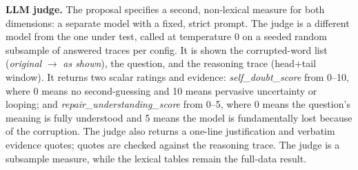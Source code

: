 \documentclass[11pt]{article}
\begin{document}
\noindent\textbf{LLM judge.} The proposal specifies a second,
non-lexical measure for both dimensions: a separate model with a fixed, strict prompt.
The judge is a different model from the one under test, called at temperature 0 on a
seeded random subsample of answered traces per config. It is shown the corrupted-word
list (\emph{original} $\to$ \emph{as shown}), the question, and the reasoning trace
(head+tail window). It returns two scalar ratings and evidence: \emph{self\_doubt\_score}
from 0--10, where 0 means no second-guessing and 10 means pervasive uncertainty or
looping; and \emph{repair\_understanding\_score} from 0--5, where 0 means the question's
meaning is fully understood and 5 means the model is fundamentally lost because of the
corruption. The judge also returns a one-line justification and verbatim evidence quotes;
quotes are checked against the reasoning trace. The judge is a subsample measure, while
the lexical tables remain the full-data result.
\medskip




\end{document}
